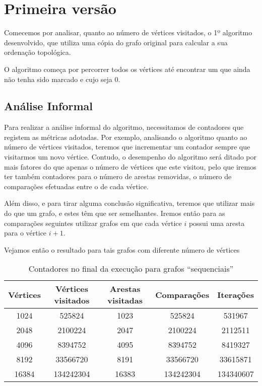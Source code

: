 \chapter{Primeira versão}
Comecemos por analisar, quanto ao número de vértices visitados, o 1º algoritmo
desenvolvido, que utiliza uma cópia do grafo original para calcular a sua
ordenação topológica.

O algoritmo começa por percorrer todos os vértices até encontrar um que ainda
não tenha sido marcado e cujo  seja 0.


\section{Análise Informal}

Para realizar a análise informal do algoritmo, necessitamos de contadores que
registem as métricas adotadas. Por exemplo, analisando o algoritmo quanto ao
número de vértices visitados, teremos que incrementar um contador sempre
que visitarmos um novo vértice. Contudo, o desempenho do algoritmo será ditado
por mais fatores do que apenas o número de vértices que este visitou, pelo que
iremos ter também contadores para o número de arestas removidas, o número de
comparações efetuadas entre o  de cada vértice.

Além disso, e para tirar alguma conclusão significativa, teremos que
utilizar mais do que um grafo, e estes têm que ser semelhantes.
Iremos então para as comparações seguintes utilizar grafos em que
cada vértice $i$ possui uma aresta para o vértice $i+1$.

Vejamos então o resultado para tais grafos com diferente número
de vértices

\begin{table}[H]
	\centering
	\begin{tabular}{| c || c | c | c | c |}
		\hline
		Vértices & Vértices visitados & Arestas visitadas & Comparações & Iterações \\
		\hline\hline
		1024     & 525824             & 1023              & 525824      & 531967    \\
		2048     & 2100224            & 2047              & 2100224     & 2112511   \\
		4096     & 8394752            & 4095              & 8394752     & 8419327   \\
		8192     & 33566720           & 8191              & 33566720    & 33615871  \\
		16384    & 134242304          & 16383             & 134242304   & 134340607 \\
		\hline
	\end{tabular}
	\caption{Contadores no final da execução para grafos \enquote{sequenciais}}
	\label{1-2}
\end{table}

